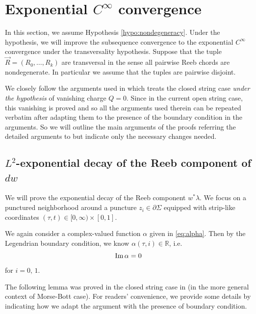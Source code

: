 \documentclass[reqno]{amsart}
\def\R{\ifmmode{\mathbb R}\else{$\mathbb R$}\fi} %
\newcommand{\del}{\partial}
\theoremstyle{theorem}
\theoremstyle{definition}
\numberwithin{equation}{section}
\def\R{{\mathbb R}}
\def\R{{\mathbb R}}
\def\R{\ifmmode{\mathbb R}\else{$\mathbb R$}\fi} %
\def\R{{\mathbb R}}
\def\R{{\mathbb R}}
\begin{document}
\section{Exponential $C^\infty$ convergence}
\label{sec:exponential-convergence}

In this section, we assume Hypothesis \ref{hypo:nondegeneracy}. Under the hypothesis,
we will improve the subsequence convergence to the exponential $C^\infty$ convergence
under the transversality hypothesis. Suppose that the tuple $\vec R= (R_0, \ldots, R_k)$ are
transversal in the sense all pairwise Reeb chords are nondegenerate. In particular we assume
that the tuples are pairwise disjoint.

We closely follow the arguments used in \cite[Section 11]{oh-wang:CR-map2}
which treats the closed string case \emph{under the hypothesis} of
vanishing charge $Q = 0$. Since in the current open string case, this vanishing is
proved and so all the arguments used therein can be repeated verbatim after adapting
them to the presence
of the boundary condition in the arguments. So we will outline the main
arguments of the proofs referring the detailed arguments to \cite[Section 11]{oh-wang:CR-map2}
but indicate only the necessary changes needed.

\subsection{$L^2$-exponential decay of the Reeb component of $dw$}
\label{subsec:Reeb}
We will prove the exponential decay of the Reeb component $w^*\lambda$.
We focus on a punctured neighborhood around a puncture $z_i \in \del \Sigma$ equipped with
strip-like coordinates $(\tau,t) \in [0,\infty) \times [0,1]$.

We again consider a complex-valued function $\alpha$ given in \eqref{eq:alpha}.
Then by the Legendrian boundary condition, we know $\alpha(\tau, i) \in \R$, i.e.
$$
\text{\rm Im}\, \alpha = 0
$$
for $i =0, \, 1$.

The following lemma was proved in the closed string case in
\cite{oh-wang:CR-map2} (in the more general context of Morse-Bott case).
For readers' convenience, we
provide some details by indicating how we adapt the argument
with the presence of boundary condition.
\end{document}
